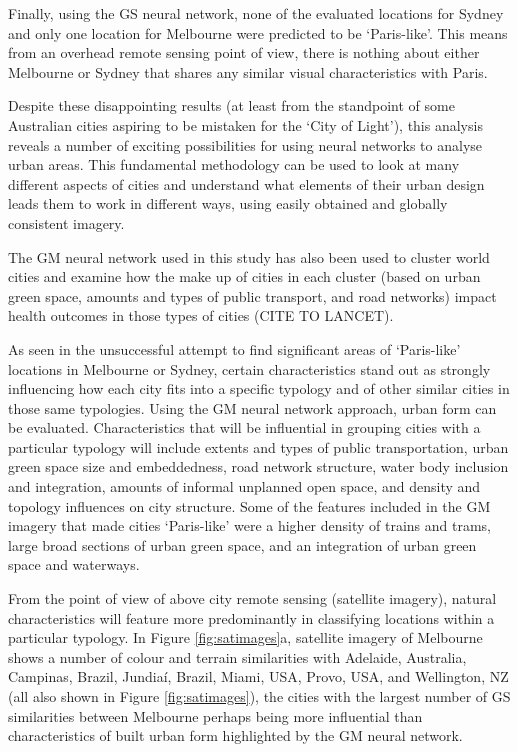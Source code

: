 \documentclass[sageh,times]{sagej}
\begin{document}
Finally, using the GS neural network, none of the evaluated locations for Sydney and only one location for Melbourne were predicted to be `Paris-like'. This means from an overhead remote sensing point of view, there is nothing about either Melbourne or Sydney that shares any similar visual characteristics with Paris.

Despite these disappointing results (at least from the standpoint of some Australian cities aspiring to be mistaken for the `City of Light'), this analysis reveals a number of exciting possibilities for using neural networks to analyse urban areas. This fundamental methodology can be used to look at many different aspects of cities and understand what elements of their urban design leads them to work in different ways, using easily obtained and globally consistent imagery. 

The GM neural network used in this study has also been used to cluster world cities and examine how the make up of cities in each cluster (based on urban green space, amounts and types of public transport, and road networks) impact health outcomes in those types of cities (CITE TO LANCET). 

As seen in the unsuccessful attempt to find significant areas of `Paris-like' locations in Melbourne or Sydney, certain characteristics stand out as strongly influencing how each city fits into a specific typology and of other similar cities in those same typologies. Using the GM neural network approach, urban form can be evaluated. Characteristics that will be influential in grouping cities with a particular typology will include extents and types of public transportation, urban green space size and embeddedness, road network structure, water body inclusion and integration, amounts of informal unplanned open space, and density and topology influences on city structure. Some of the features included in the GM imagery that made cities `Paris-like' were a higher density of trains and trams, large broad sections of urban green space, and an integration of urban green space and waterways.


From the point of view of above city remote sensing (satellite imagery), natural characteristics will feature more predominantly in classifying locations within a particular typology. In Figure \ref{fig:satimages}a, satellite imagery of Melbourne shows a number of colour and terrain similarities with Adelaide, Australia, Campinas, Brazil, Jundia\'{i}, Brazil, Miami, USA, Provo, USA, and Wellington, NZ (all also shown in Figure \ref{fig:satimages}), the cities with the largest number of GS similarities between Melbourne perhaps being more influential than characteristics of built urban form highlighted by the GM neural network.
\end{document}
